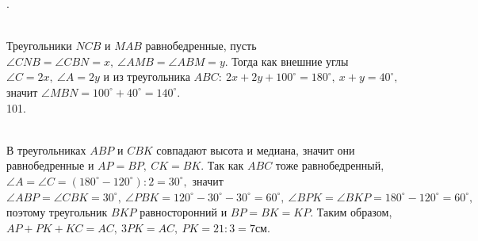 \documentclass[12pt]{article}
\begin{document}
. \begin{figure}[ht!]
\end{figure}\\
Треугольники $NCB$ и $MAB$ равнобедренные, пусть $\angle CNB=\angle CBN=x,\ \angle AMB=\angle ABM=y.$ Тогда как внешние углы $\angle C=2x,\ \angle A=2y$ и из треугольника $ABC:\ 2x+2y+100^\circ=180^\circ,\ x+y=40^\circ,$ значит $\angle MBN=100^\circ+40^\circ=140^\circ.$\\
101. \begin{figure}[ht!]
\end{figure}\\
В треугольниках $ABP$ и $CBK$ совпадают высота и медиана, значит они равнобедренные и $AP=BP,\ CK=BK.$ Так как $ABC$ тоже равнобедренный, $\angle A=\angle C=(180^\circ-120^\circ):2=30^\circ,$ значит $\angle ABP=\angle CBK=30^\circ,\ \angle PBK=120^\circ-30^\circ-30^\circ=60^\circ,\ \angle BPK=\angle BKP=180^\circ-120^\circ=60^\circ,$ поэтому треугольник $BKP$ равносторонний и $BP=BK=KP.$ Таким образом, $AP+PK+KC=AC,\ 3PK=AC,\ PK=21:3=7$см.\\
\end{document}
